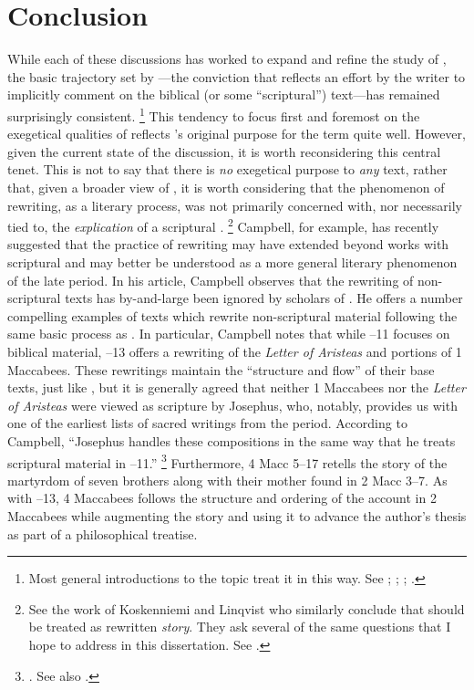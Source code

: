 \section{Conclusion}

While each of these discussions has worked to expand and refine the study of \rwb, the basic trajectory set by \vermes---the conviction that \rwb reflects an effort by the writer to implicitly comment on the biblical (or some ``scriptural'') text---has remained surprisingly consistent.%
    \footnote{%
        Most general introductions to the topic treat it in this way. See
        \cite{crawford_charlesworth2000};
        \cite{brooke_schiffman-vanderkam2000};
        \cite{zahn_lim-collins2010};
        \cite{zahn2011}.}
%
This tendency to focus first and foremost on the exegetical qualities of \rwb reflects \vermes's original purpose for the term quite well. However, given the current state of the discussion, it is worth reconsidering this central tenet. This is not to say that there is \emph{no} exegetical purpose to \emph{any} \rwb text, rather that, given a broader view of \rwb, it is worth considering that the phenomenon of rewriting, as a literary process, was not primarily concerned with, nor necessarily tied to, the \emph{explication} of a scriptural \vorlage.%
    \footnote{%
        See the work of Koskenniemi and Linqvist who similarly conclude that \rwb should be treated as rewritten \emph{story}. They ask several of the same questions that I hope to address in this dissertation. See 
        \cite{koskenniemi-lindqvist_laato-ruiten2008}.}
%
Campbell, for example, has recently suggested that the practice of rewriting may have extended beyond works with scriptural \vorlagen and may better be understood as a more general literary phenomenon of the late \secondtemple period.%
    \autocite{campbell_zsengeller2014} 
In his article, Campbell observes that the rewriting of non-scriptural texts has by-and-large been ignored by scholars of \rwb. He offers a number compelling examples of \secondtemple texts which rewrite non-scriptural material following the same basic process as \rwb. In particular, Campbell notes that while --11 focuses on biblical material, --13 offers a rewriting of the \emph{Letter of Aristeas} and portions of 1 Maccabees. These rewritings maintain the ``structure and flow'' of their base texts, just like \rwb, but it is generally agreed that neither 1 Maccabees nor the \emph{Letter of Aristeas} were viewed as scripture by Josephus, who, notably, provides us with one of the earliest lists of sacred writings from the period.%
    \autocite{mason2002_mcdonald-sanders2002}
According to Campbell, ``Josephus handles these compositions in the same way that he treats scriptural material in --11.''%
    \footnote{%
        \Cite[70]{campbell_zsengeller2014}. See also
        \cite[126]{mason2002_mcdonald-sanders2002}.}
Furthermore, 4 Macc 5--17 retells the story of the martyrdom of seven brothers along with their mother found in 2 Macc 3--7. As with --13, 4 Maccabees follows the structure and ordering of the account in 2 Maccabees while augmenting the story and using it to advance the author's thesis as part of a philosophical treatise. 

